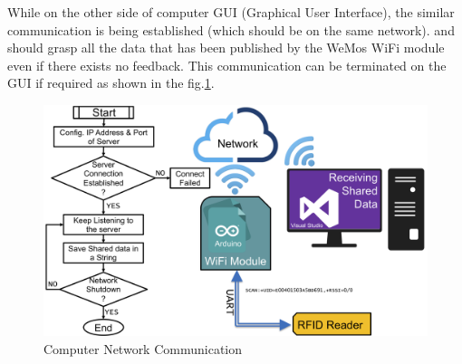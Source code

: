 While on the other side of computer GUI (Graphical User Interface), the similar communication is being established (which should be on the same network). and should grasp all the data that has been published by the WeMos WiFi module even if there exists no feedback. This communication can be terminated on the GUI if required as shown in the fig.\ref{wifi_pc}.\\
\begin{figure}[!htbp]
	\centering
	\includegraphics[width = 14cm]{Pictures/wifipc}
	\caption{Computer Network Communication}
	\label{wifi_pc}
\end{figure}\\
